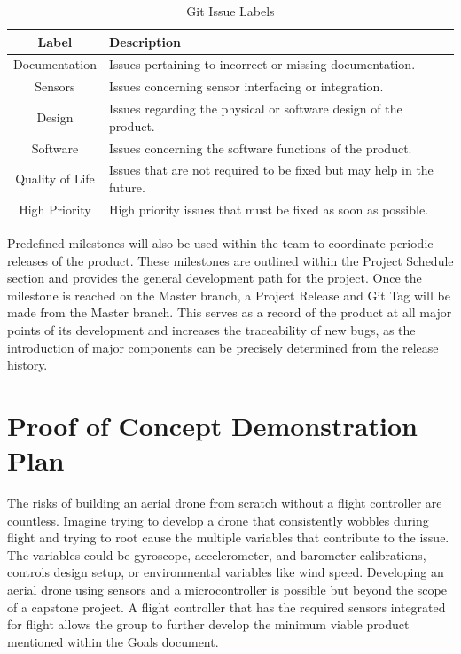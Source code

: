 \documentclass{article}
\begin{document}
\begin{table}[h]
\caption {Git Issue Labels} \label{tab:title}
\begin{center}
\begin{tabular}{ | c | l | }
\hline
Label & Description \\
\hline
Documentation & Issues pertaining to incorrect or missing documentation. \\
\hline
Sensors & Issues concerning sensor interfacing or integration. \\
\hline
Design & Issues regarding the physical or software design of the product. \\
\hline
Software & Issues concerning the software functions of the product. \\
\hline
Quality of Life & Issues that are not required to be fixed but may help in the future. \\
\hline
High Priority & High priority issues that must be fixed as soon as possible. \\
\hline
\end{tabular}
\end{center}
\end{table}

Predefined milestones will also be used within the team to coordinate periodic releases of the product. These milestones are outlined within the Project Schedule section and provides the general development path for the project. Once the milestone is reached on the Master branch, a Project Release and Git Tag will be made from the Master branch. This serves as a record of the product at all major points of its development and increases the traceability of new bugs, as the introduction of major components can be precisely determined from the release history. 

\section{Proof of Concept Demonstration Plan}

The risks of building an aerial drone from scratch without a flight controller are countless. Imagine trying to develop a drone that consistently wobbles during flight and trying to root cause the multiple variables that contribute to the issue. The variables could be gyroscope, accelerometer, and barometer calibrations, controls design setup, or environmental variables like wind speed. Developing an aerial drone using sensors and a microcontroller is possible but beyond the scope of a capstone project. A flight controller that has the required sensors integrated for flight allows the group to further develop the minimum viable product mentioned within the Goals document. 
\end{document}
